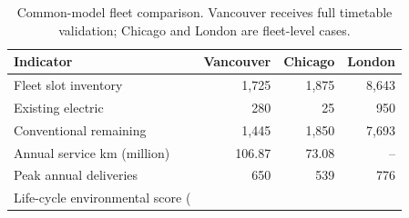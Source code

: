 \begin{table}[htbp]
\centering
\caption{Common-model fleet comparison. Vancouver receives full timetable validation; Chicago and London are fleet-level cases.}
\begin{tabularx}{\linewidth}{@{}Xrrr@{}}
\toprule
Indicator & Vancouver & Chicago & London\\
\midrule
Fleet slot inventory & 1,725 & 1,875 & 8,643\\
Existing electric & 280 & 25 & 950\\
Conventional remaining & 1,445 & 1,850 & 7,693\\
Annual service km (million) & 106.87 & 73.08 & --\\
Peak annual deliveries & 650 & 539 & 776\\
Life-cycle environmental score (%
\bottomrule
\end{tabularx}
\end{table}
